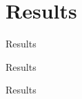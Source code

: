 \section{Results}

\begin{frame}{Results}{}
%  
\end{frame}



\begin{frame}{Results}{}
\end{frame}



\begin{frame}{Results}{}
\end{frame}

